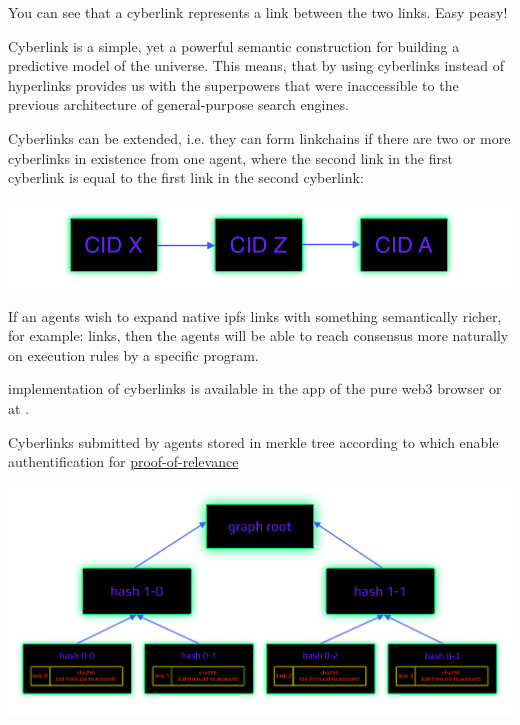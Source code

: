 \documentclass[8pt,oneside]{amsart}
\newcommand{\linkred}[2]{\href{#1}{\color{red}{#2}}}
\newcommand{\linkgreen}[2]{\href{#1}{\color{green}{#2}}}
\newenvironment{Figure}
  {\par\medskip\noindent\minipage{\linewidth}}
  {\endminipage\par\medskip}
\begin{document}
You can see that a cyberlink represents a link between the two links. Easy peasy!

Cyberlink is a simple, yet a powerful semantic construction for building a predictive model of the universe. This means, that by using cyberlinks instead of hyperlinks provides us with the superpowers that were inaccessible to the previous architecture of general-purpose search engines.

Cyberlinks can be extended, i.e. they can form linkchains if there are two or more cyberlinks in existence from one agent, where the second link in the first cyberlink is equal to the first link in the second cyberlink:

\begin{Figure}
    \centering
    \includegraphics[width=1\textwidth]{linkchain.png}
\end{Figure}

If an agents wish to expand native ipfs links with something semantically richer, for example:
\linkred{https://github.com/cybercongress/cyb/blob/dev/docs/dura.md}{dura}
links, then the agents will be able to reach consensus more naturally on execution rules by a specific program.

\linkred{https://github.com/cybercongress/cyberd}{Cyberd} implementation of cyberlinks is available in the \linkred{https://github.com/cybercongress/dot-cyber}{.cyber} app of the pure web3 browser \linkred{https://cyb.ai}{cyb} or at \linkred{http://cyber.page}{cyber.page}.

Cyberlinks submitted by agents stored in merkle tree according to \linkgreen{https://ipfs.io/ipfs/QmUUTW5gpJx7g5QF3PRkhjkk7jqs3r8EWcuVpZ9dHfx7DE}{RFC-6962 standard} which enable authentification for {\hyperref[proof-of-relevance]{proof-of-relevance}}

\begin{Figure}
    \centering
    \includegraphics[width=1\textwidth]{graph-tree.png}
\end{Figure}
\end{document}
